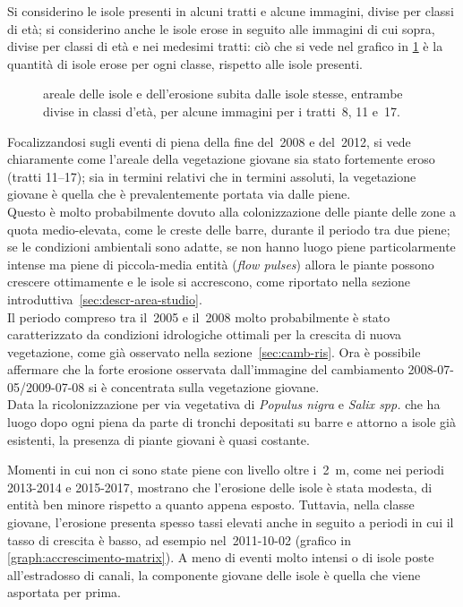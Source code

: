 Si considerino le isole presenti in alcuni tratti e alcune immagini, divise per classi di età; si considerino anche le isole erose in seguito alle immagini di cui sopra, divise per classi di età e nei medesimi tratti: ciò che si vede nel grafico in \cref{graph:distr-eta} è la quantità di isole erose per ogni classe, rispetto alle isole presenti. 
%
\begin{figure}
	\centering
	
	\caption[areale delle isole e dell'erosione subita divise in classi d'età per i tratti~8, 11 e~17]{areale delle isole e dell'erosione subita dalle isole stesse, entrambe divise in classi d'età, per alcune immagini per i tratti~8, 11 e~17.}
	\label{graph:distr-eta}
\end{figure}
%
Focalizzandosi sugli eventi di piena della fine del~2008 e del~2012, si vede chiaramente come l'areale della vegetazione giovane sia stato fortemente eroso (tratti \numrange[range-phrase={ e }]{11}{17});
sia in termini relativi che in termini assoluti, la vegetazione giovane è quella che è prevalentemente portata via dalle piene.
\\
Questo è molto probabilmente dovuto alla colonizzazione delle piante delle zone a quota medio-elevata, come le creste delle barre, durante il periodo tra due piene; 
se le condizioni ambientali sono adatte, se non hanno luogo piene particolarmente intense ma piene di piccola-media entità (\emph{flow pulses}) allora le piante possono crescere ottimamente e le isole si accrescono, come riportato nella sezione introduttiva~\ref{sec:descr-area-studio}.
\\
Il periodo compreso tra il~2005 e il~2008 molto probabilmente è stato caratterizzato da condizioni idrologiche ottimali per la crescita di nuova vegetazione, come già osservato nella sezione~\ref{sec:camb-ris}.
Ora è possibile affermare che la forte erosione osservata dall'immagine del cambiamento 2008-07-05/2009-07-08 si è concentrata sulla vegetazione giovane.
\\
Data la ricolonizzazione per via vegetativa di \emph{Populus nigra} e \emph{Salix spp.} che ha luogo dopo ogni piena da parte di tronchi depositati su barre e attorno a isole già esistenti, la presenza di piante giovani è quasi costante.

Momenti in cui non ci sono state piene con livello oltre i~\SI{2}{\m}, come nei periodi 2013-2014 e 2015-2017, mostrano che l'erosione delle isole è stata modesta, di entità ben minore rispetto a quanto appena esposto. Tuttavia, nella classe giovane, l'erosione presenta spesso tassi elevati anche in seguito a periodi in cui il tasso di crescita è basso, ad esempio nel~2011-10-02 (grafico in \cref{graph:accrescimento-matrix}).
A meno di eventi molto intensi o di isole poste all'estradosso di canali, la componente giovane delle isole è quella che viene asportata per prima.

